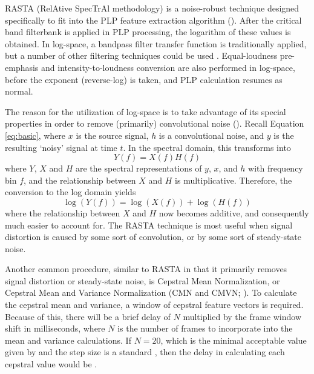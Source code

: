 RASTA (RelAtive SpecTrAl methodology) is a noise-robust technique designed specifically to fit into the PLP feature extraction algorithm (\cite{hermansky:92}).  After the critical band filterbank is applied in PLP processing, the logarithm of these values is obtained.  In log-space, a bandpass filter transfer function is traditionally applied, but a number of other filtering techniques could be used \DIFdelbegin {}\DIFdelend \DIFaddbegin {}\DIFaddend .  Equal-loudness pre-emphasis and intensity-to-loudness conversion are also performed in log-space, before the exponent (reverse-log) is taken, and PLP calculation resumes as normal.

The reason for the utilization of log-space is to take advantage of its special properties in order to remove (primarily) convolutional noise (\cite{gold:11}).  Recall Equation \ref{eq:basic}, where $x$ is the source signal, $h$ is a convolutional noise, and $y$ is the resulting `noisy' signal at time $t$.  In the spectral domain, this transforms into \begin{equation} Y(f) = X(f)H(f) \end{equation} where $Y$, $X$ and $H$ are the spectral representations of $y$, $x$, and $h$ with frequency bin $f$, and the relationship between $X$ and $H$ is multiplicative.  Therefore, the conversion to the log domain yields \begin{equation} \log(Y(f)) = \log(X(f)) + \log(H(f)) \end{equation} where the relationship between $X$ and $H$ now becomes additive, and consequently much easier to account for.  The RASTA technique is most useful when signal distortion is caused by some sort of convolution, or by some sort of steady-state noise.

Another common procedure, similar to RASTA in that it primarily removes signal distortion or steady-state noise, is Cepstral Mean Normalization, or Cepstral Mean and Variance Normalization (CMN and CMVN; \cite{atal:74,viikki:98}).  To calculate the cepstral mean and variance, a window of cepstral feature vectors is required.  Because of this, there will be a brief delay of $N$ multiplied by the frame window shift in milliseconds, where $N$ is the number of frames to incorporate into the mean and variance calculations.  If $N=20$, which is the minimal acceptable value given by \cite{viikki:98} and the step size is a standard \DIFdelbegin {}\DIFdelend \DIFaddbegin {}\DIFaddend , then the delay in calculating each cepstral value would be \DIFdelbegin {}\DIFdelend \DIFaddbegin {}\DIFaddend .

